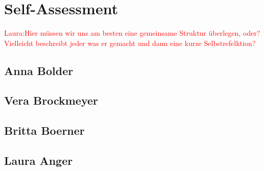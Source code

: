 \section{Self-Assessment} \label{sec:SA} %

\textcolor{red}{Laura:Hier müssen wir uns am besten eine gemeinsame Struktur überlegen, oder? Vielleicht beschreibt jeder was er gemacht und dann eine kurze Selbstrefelktion?}


\subsection{Anna Bolder} \label{sec:SAAnna}



\subsection{Vera Brockmeyer} \label{sec:SAVera}

\subsection{Britta Boerner} \label{sec:SABritta}


\subsection{Laura Anger} \label{sec:SALaura}

\newpage

























